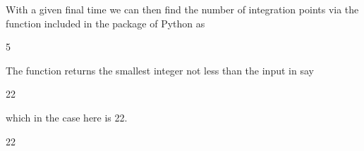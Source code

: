 \documentclass[letterpaper,10pt,english]{sphinxmanual}
\begin{document}
\begin{sphinxVerbatim}[commandchars=\\\{\}]
  
\end{sphinxVerbatim}

With a given final time   we can then find the number of integration points via the  function included in the  package of Python
as

\begin{sphinxVerbatim}[commandchars=\\\{\}]
   
  
  
\end{sphinxVerbatim}

\begin{sphinxVerbatim}[commandchars=\\\{\}]
5
\end{sphinxVerbatim}

The  function returns the smallest integer not less than the input in say

\begin{sphinxVerbatim}[commandchars=\\\{\}]
  
\end{sphinxVerbatim}

\begin{sphinxVerbatim}[commandchars=\\\{\}]
22
\end{sphinxVerbatim}

which in the case here is 22.

\begin{sphinxVerbatim}[commandchars=\\\{\}]
  
\end{sphinxVerbatim}

\begin{sphinxVerbatim}[commandchars=\\\{\}]
22
\end{sphinxVerbatim}
\end{document}
